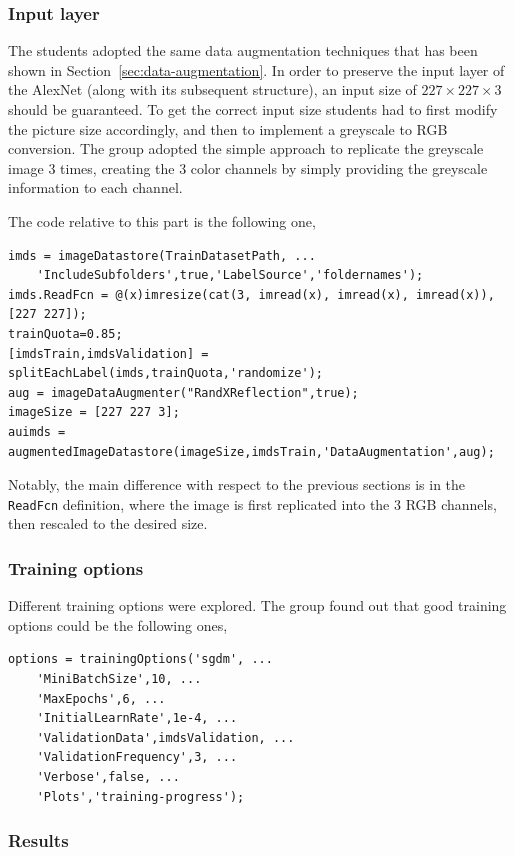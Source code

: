 \documentclass[a4paper, 11pt]{article} %
\begin{document}
\subsubsection{Input layer}

The students adopted the same data augmentation techniques that has been shown in Section~\ref{sec:data-augmentation}. In order to preserve the input layer of the AlexNet (along with its subsequent structure), an input size of $227 \times 227 \times 3$ should be guaranteed. To get the correct input size students had to first modify the picture size accordingly, and then to implement a greyscale to RGB conversion. The group adopted the simple approach to replicate the greyscale image $3$ times, creating the $3$ color channels by simply providing the greyscale information to each channel.

The code relative to this part is the following one,

\begin{lstlisting}
imds = imageDatastore(TrainDatasetPath, ...
    'IncludeSubfolders',true,'LabelSource','foldernames');
imds.ReadFcn = @(x)imresize(cat(3, imread(x), imread(x), imread(x)), [227 227]);
trainQuota=0.85;
[imdsTrain,imdsValidation] = splitEachLabel(imds,trainQuota,'randomize');
aug = imageDataAugmenter("RandXReflection",true);
imageSize = [227 227 3];
auimds = augmentedImageDatastore(imageSize,imdsTrain,'DataAugmentation',aug);
\end{lstlisting}

Notably, the main difference with respect to the previous sections is in the \texttt{ReadFcn} definition, where the image is first replicated into the $3$ RGB channels, then rescaled to the desired size.

\subsubsection{Training options}

Different training options were explored. The group found out that good training options could be the following ones,

\begin{lstlisting}
options = trainingOptions('sgdm', ...
    'MiniBatchSize',10, ...
    'MaxEpochs',6, ...
    'InitialLearnRate',1e-4, ...
    'ValidationData',imdsValidation, ...
    'ValidationFrequency',3, ...
    'Verbose',false, ...
    'Plots','training-progress');
\end{lstlisting}

\subsubsection{Results}
\end{document}
